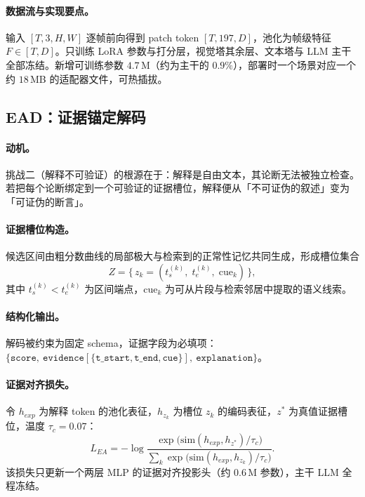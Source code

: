 \paragraph{数据流与实现要点。} 输入 $[T,3,H,W]$ 逐帧前向得到 patch token $[T,197,D]$，池化为帧级特征 $F \in [T,D]$。只训练 LoRA 参数与打分层，视觉塔其余层、文本塔与 LLM 主干全部冻结。新增可训练参数 $4.7$\,M（约为主干的 $0.9\%$），部署时一个场景对应一个约 $18$\,MB 的适配器文件，可热插拔。

\subsection{EAD：证据锚定解码}

\paragraph{动机。} 挑战二（解释不可验证）的根源在于：解释是自由文本，其论断无法被独立检查。若把每个论断绑定到一个可验证的证据槽位，解释便从「不可证伪的叙述」变为「可证伪的断言」。

\paragraph{证据槽位构造。} 候选区间由粗分数曲线的局部极大与检索到的正常性记忆共同生成，形成槽位集合
\begin{equation}
Z = \{\, z_k = (t_s^{(k)},\; t_e^{(k)},\; \mathrm{cue}_k) \,\},
\end{equation}
其中 $t_s^{(k)} < t_e^{(k)}$ 为区间端点，$\mathrm{cue}_k$ 为可从片段与检索邻居中提取的语义线索。

\paragraph{结构化输出。} 解码被约束为固定 schema，证据字段为必填项：$\{\texttt{score},\ \texttt{evidence}[\{\texttt{t\_start},\texttt{t\_end},\texttt{cue}\}],\ \texttt{explanation}\}$。

\paragraph{证据对齐损失。} 令 $h_{exp}$ 为解释 token 的池化表征，$h_{z_k}$ 为槽位 $z_k$ 的编码表征，$z^{*}$ 为真值证据槽位，温度 $\tau_c{=}0.07$：
\begin{equation}
L_{EA} = -\log \frac{\exp\!\big(\mathrm{sim}(h_{exp}, h_{z^{*}})/\tau_c\big)}{\sum_{k} \exp\!\big(\mathrm{sim}(h_{exp}, h_{z_k})/\tau_c\big)}.
\end{equation}
该损失只更新一个两层 MLP 的证据对齐投影头（约 $0.6$\,M 参数），主干 LLM 全程冻结。

